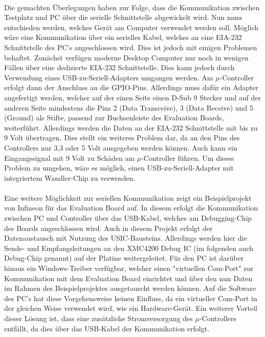 \paragraph{}
Die gemachten Überlegungen haben zur Folge, dass die Kommunikation zwischen Testplatz und PC über die serielle Schnittstelle abgewickelt wird. Nun muss entschieden werden, welches Gerät am Computer verwendet werden soll. Möglich wäre eine Kommunikation über ein serielles Kabel, welches an eine EIA-232 Schnittstelle des PC's angeschlossen wird. Dies ist jedoch mit einigen Problemen behaftet. Zunächst verfügen moderne Desktop Computer nur noch in wenigen Fällen über eine dedizierte EIA-232 Schnittstelle. Dies kann jedoch durch Verwendung eines USB-zu-Seriell-Adapters umgangen werden. Am $\mu$-Controller erfolgt dann der Anschluss an die GPIO-Pins. Allerdings muss dafür ein Adapter angefertigt werden, welcher auf der einen Seite einen D-Sub 9 Stecker und auf der anderen Seite mindestens die Pins 2 (Data Transceive), 3 (Data Receive) und 5 (Ground) als Stifte, passend zur Buchsenleiste des Evaluation Boards, weiterführt. Allerdings werden die Daten an der EIA-232 Schnittstelle mit bis zu 9 Volt übertragen. Dies stellt ein weiteres Problem dar, da an den Pins des Controllers nur 3,3 oder 5 Volt ausgegeben werden können. Auch kann ein Eingangssignal mit 9 Volt zu Schäden am $\mu$-Controller führen. Um dieses Problem zu umgehen, wäre es möglich, einen USB-zu-Seriell-Adapter mit integriertem Wandler-Chip zu verwenden.
\paragraph{}
Eine weitere Möglichkeit zur seriellen Kommunikation zeigt ein Beispielprojekt von Infineon für das Evaluation Board auf. In diesem erfolgt die Kommunikation zwischen PC und Controller über das USB-Kabel, welches am Debugging-Chip des Boards angeschlossen wird. Auch in diesem Projekt erfolgt der Datenaustausch mit Nutzung des USIC-Bausteins. Allerdings werden hier die Sende- und Empfangsleitungen an den XMC4200 Debug IC (im folgenden auch Debug-Chip genannt) auf der Platine weitergeleitet. Für den PC ist darüber hinaus ein Windows-Treiber verfügbar, welcher einen "virtuellen Com-Port" zur Kommunikation mit dem Evaluation Board einrichtet und über den nun Daten im Rahmen des Beispielprojektes ausgetauscht werden können. Auf die Software des PC's hat diese Vorgehensweise keinen Einfluss, da ein virtueller Com-Port in der gleichen Weise verwendet wird, wie ein Hardware-Gerät. Ein weiterer Vorteil dieser Lösung ist, dass eine zusätzliche Stromversorgung des $\mu$-Controllers entfällt, da dies über das USB-Kabel der Kommunikation erfolgt.
